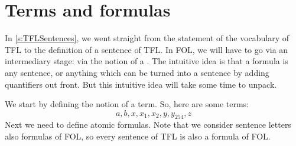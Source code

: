 \section{Terms and formulas}
\label{s:TermsFormulas}

In \cref{s:TFLSentences}, we went straight from the statement of the vocabulary of TFL to the definition of a sentence of TFL. In FOL, we will have to go via an intermediary stage: via the notion of a . The intuitive idea is that a formula is any sentence, or anything which can be turned into a sentence by adding quantifiers out front. But this intuitive idea will take some time to unpack.

We start by defining the notion of a term.
So, here are some terms:
	$$a, b, x, x_1, x_2, y, y_{254}, z$$
Next we need to define atomic formulas.
Note that we consider sentence letters also formulas of FOL, so every sentence of TFL is also a formula of FOL.




